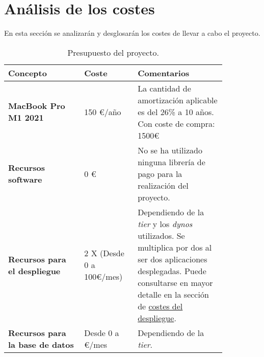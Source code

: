 \chapter{Análisis de los costes}
En esta sección se analizarán y desglosarán los costes de llevar a cabo el proyecto.

\begin{table}[H]
    \centering
    \begin{center}
        \begin{tabular}{| p{0.3\linewidth} | p{0.2\linewidth} | p{0.35\linewidth}|}
            \hline
            \rowcolor[HTML]{ECF4FF} 
            \textbf{Concepto} & \textbf{Coste} & \textbf{Comentarios}\\ \hline
            \textbf{MacBook Pro M1 2021} & 150 €/año & La cantidad de amortización aplicable es del 26\% a 10 años. Con
            coste de compra: 1500€\\
            \textbf{Recursos software} & 0 € & No se ha utilizado ninguna librería de pago para la realización del
            proyecto.\\
            \textbf{Recursos para el despliegue } & 2 X (Desde 0 a 100€/mes) & Dependiendo de la \textit{tier} y los
            \textit{dynos} utilizados. Se multiplica por dos al ser dos aplicaciones desplegadas. Puede consultarse en
            mayor detalle en la sección de \hyperref[sec:costes-despliegue]{costes del despliegue}.\\
            \textbf{Recursos para la base de datos} & Desde 0 a €/mes & Dependiendo de la \textit{tier}.\\
            \hline
        \end{tabular}
        \caption{Presupuesto del proyecto.}
    \end{center}
\end{table}
